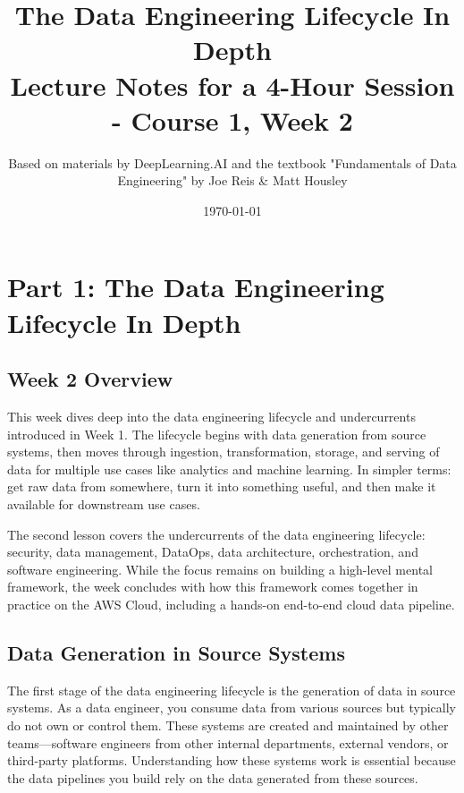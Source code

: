 \documentclass{article}
\title{The Data Engineering Lifecycle In Depth \\ \large{Lecture Notes for a 4-Hour Session - Course 1, Week 2}}
\author{Based on materials by DeepLearning.AI and the textbook "Fundamentals of Data Engineering" by Joe Reis \& Matt Housley}
\date{\today}
\begin{document}
\maketitle
\tableofcontents
\newpage


\section{Part 1: The Data Engineering Lifecycle In Depth}

\subsection{Week 2 Overview}
This week dives deep into the data engineering lifecycle and undercurrents introduced in Week 1. The lifecycle begins with data generation from source systems, then moves through ingestion, transformation, storage, and serving of data for multiple use cases like analytics and machine learning. In simpler terms: get raw data from somewhere, turn it into something useful, and then make it available for downstream use cases.

The second lesson covers the undercurrents of the data engineering lifecycle: security, data management, DataOps, data architecture, orchestration, and software engineering. While the focus remains on building a high-level mental framework, the week concludes with how this framework comes together in practice on the AWS Cloud, including a hands-on end-to-end cloud data pipeline.

\subsection{Data Generation in Source Systems}
The first stage of the data engineering lifecycle is the generation of data in source systems. As a data engineer, you consume data from various sources but typically do not own or control them. These systems are created and maintained by other teams---software engineers from other internal departments, external vendors, or third-party platforms. Understanding how these systems work is essential because the data pipelines you build rely on the data generated from these sources.
\end{document}
